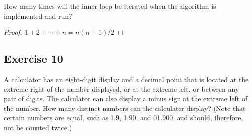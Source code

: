 \documentclass[14pt]{extarticle}
\begin{document}
How many times will the inner loop be iterated when the algorithm is implemented and run?

\begin{proof}
\(1 + 2 + \cdots + n = n(n+1)/2\)
\end{proof}

\subsection{Exercise 10}
A calculator has an eight-digit display and a decimal point that is located at the extreme right of the number 
displayed, or at the extreme left, or between any pair of digits. The calculator can also display a minus sign at the 
extreme left of the number. How many distinct numbers can the calculator display? (Note that certain numbers are 
equal, such as 1.9, 1.90, and 01.900, and should, therefore, not be counted twice.)
\end{document}
